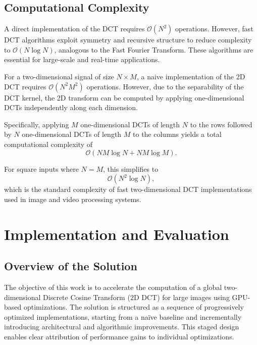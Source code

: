 \documentclass{article}
\begin{document}
\subsection{Computational Complexity}

A direct implementation of the DCT requires $\mathcal{O}(N^2)$ operations. However, fast DCT algorithms exploit symmetry and recursive structure to reduce complexity to $\mathcal{O}(N \log N)$, analogous to the Fast Fourier Transform. These algorithms are essential for large-scale and real-time applications.


For a two-dimensional signal of size $N \times M$, a naive implementation of the 2D DCT requires $\mathcal{O}(N^2 M^2)$ operations. However, due to the separability of the DCT kernel, the 2D transform can be computed by applying one-dimensional DCTs independently along each dimension.

Specifically, applying $M$ one-dimensional DCTs of length $N$ to the rows followed by $N$ one-dimensional DCTs of length $M$ to the columns yields a total computational complexity of
\begin{equation}
\mathcal{O}(NM \log N + NM \log M).
\end{equation}

For square inputs where $N = M$, this simplifies to
\begin{equation}
\mathcal{O}(N^2 \log N),
\end{equation}
which is the standard complexity of fast two-dimensional DCT implementations used in image and video processing systems.

\section{Implementation and Evaluation}

\subsection{Overview of the Solution}

The objective of this work is to accelerate the computation of a global two-dimensional Discrete Cosine Transform (2D DCT) for large images using GPU-based optimizations. The solution is structured as a sequence of progressively optimized implementations, starting from a naïve baseline and incrementally introducing architectural and algorithmic improvements. This staged design enables clear attribution of performance gains to individual optimizations.
\end{document}
